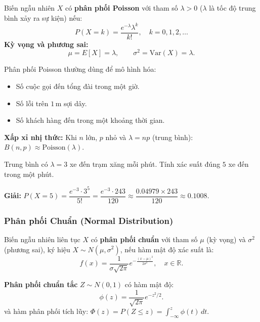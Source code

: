 \documentclass[12pt,a4paper]{article}
\begin{document}
\begin{dinhnghia}[title={Phân phối Poisson}]
  Biến ngẫu nhiên $X$ có \textbf{phân phối Poisson} với tham số $\lambda > 0$ ($\lambda$ là tốc độ trung bình xảy ra sự kiện) nếu:
  \[
    P(X = k) = \frac{e^{-\lambda} \lambda^k}{k!}, \quad k = 0, 1, 2, \ldots
  \]
  \textbf{Kỳ vọng và phương sai:}
  \[
    \mu = E[X] = \lambda, \qquad \sigma^2 = \text{Var}(X) = \lambda.
  \]
\end{dinhnghia}

\begin{luuy}
  Phân phối Poisson thường dùng để mô hình hóa:
  \begin{itemize}
    \item Số cuộc gọi đến tổng đài trong một giờ.
    \item Số lỗi trên $1\,\text{m}$ sợi dây.
    \item Số khách hàng đến trong một khoảng thời gian.
  \end{itemize}
  \textbf{Xấp xỉ nhị thức:} Khi $n$ lớn, $p$ nhỏ và $\lambda = np$ (trung bình): $B(n,p) \approx \text{Poisson}(\lambda)$.
\end{luuy}

\begin{vidu}
  Trung bình có $\lambda = 3$ xe đến trạm xăng mỗi phút. Tính xác suất đúng $5$ xe đến trong một phút.

  \medskip\textbf{Giải:}
  $P(X=5) = \dfrac{e^{-3} \cdot 3^5}{5!} = \dfrac{e^{-3} \cdot 243}{120} \approx \dfrac{0.04979 \times 243}{120} \approx 0.1008$.
\end{vidu}

\subsubsection{Phân phối Chuẩn (Normal Distribution)}

\begin{dinhnghia}[title={Phân phối chuẩn}]
  Biến ngẫu nhiên liên tục $X$ có \textbf{phân phối chuẩn} với tham số $\mu$ (kỳ vọng) và $\sigma^2$ (phương sai), ký hiệu $X \sim N(\mu, \sigma^2)$, nếu hàm mật độ xác suất là:
  \[
    f(x) = \frac{1}{\sigma\sqrt{2\pi}} e^{-\frac{(x-\mu)^2}{2\sigma^2}}, \quad x \in \mathbb{R}.
  \]
\end{dinhnghia}

\begin{dinhnghia}[title={Phân phối chuẩn tắc (Standard Normal)}]
  \textbf{Phân phối chuẩn tắc} $Z \sim N(0,1)$ có hàm mật độ:
  \[
    \phi(z) = \frac{1}{\sqrt{2\pi}} e^{-z^2/2}.
  \]
  và hàm phân phối tích lũy: $\Phi(z) = P(Z \le z) = \displaystyle\int_{-\infty}^z \phi(t)\,dt$.
\end{dinhnghia}
\end{document}
